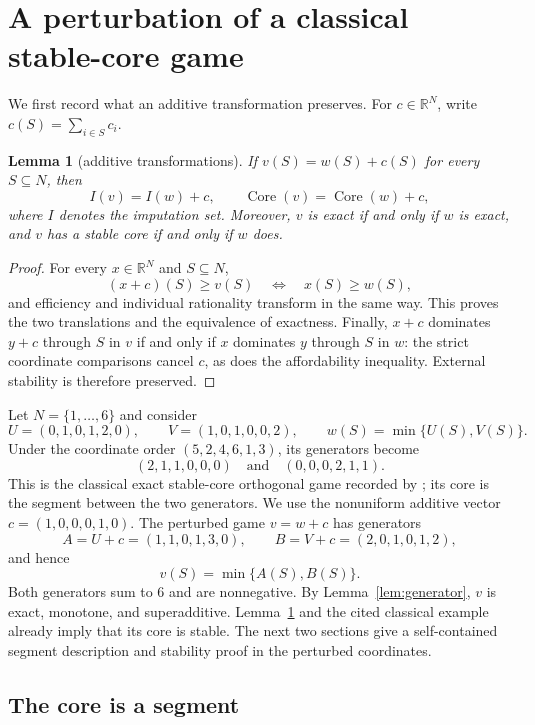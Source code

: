 \documentclass[11pt]{article}
\newtheorem{lemma}[theorem]{Lemma}
\newcommand{\R}{\mathbb{R}}
\newcommand{\core}{\operatorname{Core}}
\begin{document}
\section{A perturbation of a classical stable-core game}\label{sec:witness}

We first record what an additive transformation preserves. For
$c\in\R^N$, write $c(S)=\sum_{i\in S}c_i$.

\begin{lemma}[additive transformations]\label{lem:additive}
If $v(S)=w(S)+c(S)$ for every $S\subseteq N$, then
\[
 I(v)=I(w)+c,\qquad \core(v)=\core(w)+c,
\]
where $I$ denotes the imputation set. Moreover, $v$ is exact if and only if
$w$ is exact, and $v$ has a stable core if and only if $w$ does.
\end{lemma}

\begin{proof}
For every $x\in\R^N$ and $S\subseteq N$,
\[
 (x+c)(S)\ge v(S)\quad\Longleftrightarrow\quad x(S)\ge w(S),
\]
and efficiency and individual rationality transform in the same way. This
proves the two translations and the equivalence of exactness. Finally,
$x+c$ dominates $y+c$ through $S$ in $v$ if and only if $x$ dominates $y$
through $S$ in $w$: the strict coordinate comparisons cancel $c$, as does
the affordability inequality. External stability is therefore preserved.
\end{proof}

Let $N=\{1,\dots,6\}$ and consider
\[
 U=(0,1,0,1,2,0),\qquad V=(1,0,1,0,0,2),\qquad
 w(S)=\min\{U(S),V(S)\}.
\]
Under the coordinate order $(5,2,4,6,1,3)$, its generators become
\[
 (2,1,1,0,0,0)\quad\text{and}\quad(0,0,0,2,1,1).
\]
This is the classical exact stable-core orthogonal game recorded by
\citet[][Example~4.3]{Shellshear2009}; its core is the segment between the
two generators. We use the nonuniform additive vector
$c=(1,0,0,0,1,0)$. The perturbed game $v=w+c$ has generators
\[
 A=U+c=(1,1,0,1,3,0),\qquad
 B=V+c=(2,0,1,0,1,2),
\]
and hence
\begin{equation}\label{eq:game}
 v(S)=\min\{A(S),B(S)\}.
\end{equation}
Both generators sum to $6$ and are nonnegative. By
Lemma~\ref{lem:generator}, $v$ is exact, monotone, and superadditive.
Lemma~\ref{lem:additive} and the cited classical example already imply that
its core is stable. The next two sections give a self-contained segment
description and stability proof in the perturbed coordinates.

\subsection{The core is a segment}
\end{document}
